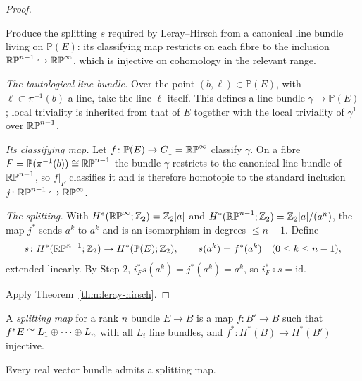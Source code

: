 \begin{proof}
\begin{strategy}
Produce the splitting $s$ required by Leray--Hirsch from a canonical line bundle
living on $\mathbb P(E)$: its classifying map restricts on each fibre to the
inclusion $\mathbb{RP}^{n-1}\hookrightarrow\mathbb{RP}^\infty$, which is injective on
cohomology in the relevant range.
\end{strategy}

 \emph{The tautological line bundle.} Over the point
$(b,\ell)\in\mathbb P(E)$, with $\ell\subset\pi^{-1}(b)$ a line, take the line
$\ell$ itself. This defines a line bundle $\gamma\to\mathbb P(E)$; local
triviality is inherited from that of $E$ together with the local triviality of
$\gamma^1$ over $\mathbb{RP}^{n-1}$.

 \emph{Its classifying map.} Let
$f\colon\mathbb P(E)\to G_1=\mathbb{RP}^\infty$ classify $\gamma$. On a fibre
$F=\mathbb P(\pi^{-1}(b))\cong\mathbb{RP}^{n-1}$ the bundle $\gamma$ restricts to the
canonical line bundle of $\mathbb{RP}^{n-1}$, so $f|_F$ classifies it and is therefore
homotopic to the standard inclusion $j\colon\mathbb{RP}^{n-1}\hookrightarrow\mathbb{RP}^\infty$.

 \emph{The splitting.} With
$H^*(\mathbb{RP}^\infty;\mathbb{Z}_2)=\mathbb{Z}_2[a]$ and
$H^*(\mathbb{RP}^{n-1};\mathbb{Z}_2)=\mathbb{Z}_2[a]/(a^{n})$, the map $j^*$ sends $a^k$ to $a^k$ and is
an isomorphism in degrees $\le n-1$. Define
\[
s\colon H^*(\mathbb{RP}^{n-1};\mathbb{Z}_2)\to H^*(\mathbb P(E);\mathbb{Z}_2),
\qquad s(a^k)=f^*(a^k)\quad(0\le k\le n-1),
\]
extended linearly. By Step 2, $i_F^*s(a^k)=j^*(a^k)=a^k$, so
$i_F^*\circ s=\mathrm{id}$.

 Apply Theorem~\ref{thm:leray-hirsch}.
\end{proof}

\begin{definition}
A \emph{splitting map} for a rank $n$ bundle $E\to B$ is a map $f\colon B'\to B$
such that $f^*E\cong L_1\oplus\dots\oplus L_n$ with all $L_i$ line bundles, and
$f^*\colon H^*(B)\to H^*(B')$ injective.
\end{definition}

\begin{corollary}\label{cor:splitting}
Every real vector bundle admits a splitting map.
\end{corollary}

